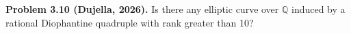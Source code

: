 \textbf{Problem 3.10 (Dujella, 2026).} Is there any elliptic curve over $\mathbb{Q}$ induced by a rational Diophantine quadruple with rank greater than 10?
